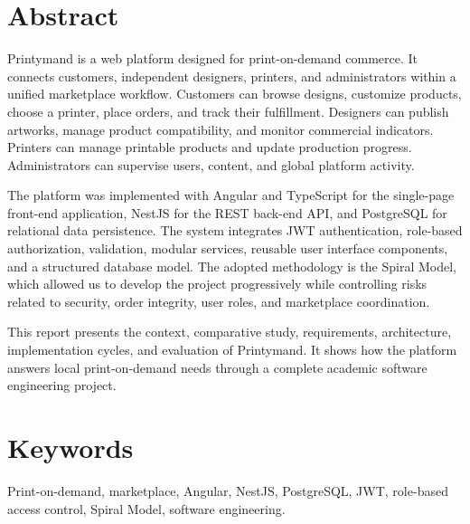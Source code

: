 
\section*{Abstract}
\label{sec::abstract}

Printymand is a web platform designed for print-on-demand commerce. It connects customers, independent designers, printers, and administrators within a unified marketplace workflow. Customers can browse designs, customize products, choose a printer, place orders, and track their fulfillment. Designers can publish artworks, manage product compatibility, and monitor commercial indicators. Printers can manage printable products and update production progress. Administrators can supervise users, content, and global platform activity.

The platform was implemented with Angular and TypeScript for the single-page front-end application, NestJS for the REST back-end API, and PostgreSQL for relational data persistence. The system integrates JWT authentication, role-based authorization, validation, modular services, reusable user interface components, and a structured database model. The adopted methodology is the Spiral Model, which allowed us to develop the project progressively while controlling risks related to security, order integrity, user roles, and marketplace coordination.

This report presents the context, comparative study, requirements, architecture, implementation cycles, and evaluation of Printymand. It shows how the platform answers local print-on-demand needs through a complete academic software engineering project.

\newpage
\section*{Keywords}
\label{sec::keywords}

Print-on-demand, marketplace, Angular, NestJS, PostgreSQL, JWT, role-based access control, Spiral Model, software engineering.
